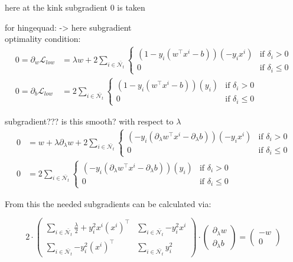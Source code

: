 	here at the kink subgradient 0 is taken

for hingequad: -> here subgradient \\
optimality condition:
\begin{align}
	0 = \partial_{w}\mathcal{L}_{low} &= \lambda w+2\sum_{i \in \bar{\mathcal{N}_t}}{\left\{\begin{array}{cl} (1-y_i(w^{\top}x^i-b))(-y_ix^i) & \text{if } \delta_i >0 \\ 0 & \text{if } \delta_i \leq 0 \end{array} \right.} \\
	0 = \partial_b\mathcal{L}_{low} &= 2\sum_{i \in \bar{\mathcal{N}_t}}{\left\{\begin{array}{cl} (1-y_i(w^{\top}x^i-b))(y_i) & \text{if } \delta_i >0 \\ 0 & \text{if } \delta_i \leq 0 \end{array} \right.}
	\end{align}
	
subgradient??? is this smooth? with respect to \(\lambda\)
\begin{align}
	0 &= w+\lambda\partial_{\lambda}w+2\sum_{i \in \bar{\mathcal{N}_t}}{\left\{\begin{array}{cl} (-y_i(\partial_{\lambda}w^{\top}x^i-\partial_{\lambda}b))(-y_ix^i) & \text{if } \delta_i >0 \\ 0 & \text{if } \delta_i \leq 0 \end{array} \right.} \\
	0 &= 2\sum_{i \in \bar{\mathcal{N}_t}}{\left\{\begin{array}{cl} (-y_i(\partial_{\lambda}w^{\top}x^i-\partial_{\lambda}b))(y_i) & \text{if } \delta_i >0 \\ 0 & \text{if } \delta_i \leq 0 \end{array} \right.}
\end{align}

From this the needed subgradients can be calculated via:

\begin{equation}
	2\cdot\begin{pmatrix} \sum_{i \in \bar{\mathcal{N}_t}}\frac{\lambda}{2}+{y_i^2x^i(x^i)^{\top}} & \sum_{i \in \bar{\mathcal{N}_t}}	{-y_i^2x^i} \\ \sum_{i \in \bar{\mathcal{N}_t}}{-y_i^2(x^i)^{\top}} & \sum_{i \in \bar{\mathcal{N}_t}}{y_i^2}\end{pmatrix}
	\cdot \begin{pmatrix} \partial_{\lambda}w \\ \partial_{\lambda}b\end{pmatrix}
	= \begin{pmatrix}-w \\ 0\end{pmatrix}
\label{subgr_wb}
\end{equation}

